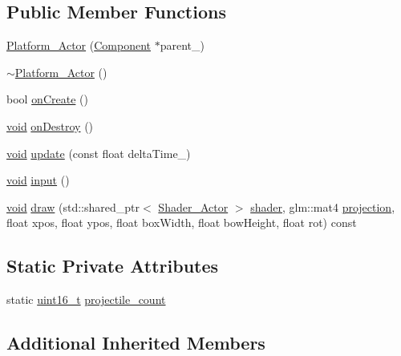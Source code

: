 \subsection*{Public Member Functions}
\begin{DoxyCompactItemize}
\item 
\hyperlink{classPlatform__Actor_ab36d9c9db7a8a50dc7334d44332dc6ce}{Platform\+\_\+\+Actor} (\hyperlink{classComponent}{Component} $\ast$parent\+\_\+)
\item 
\hyperlink{classPlatform__Actor_ab92fd758cdb90a4ddd74f5d4385ed652}{$\sim$\+Platform\+\_\+\+Actor} ()
\item 
bool \hyperlink{classPlatform__Actor_ab902e2540f1d3127dedff632841b4921}{on\+Create} ()
\item 
\hyperlink{imgui__impl__opengl3__loader_8h_ac668e7cffd9e2e9cfee428b9b2f34fa7}{void} \hyperlink{classPlatform__Actor_a34b915aa583cdf659ec29368b6feb7e8}{on\+Destroy} ()
\item 
\hyperlink{imgui__impl__opengl3__loader_8h_ac668e7cffd9e2e9cfee428b9b2f34fa7}{void} \hyperlink{classPlatform__Actor_a12b22d88efc384ac35060d04fbbe710d}{update} (const float delta\+Time\+\_\+)
\item 
\hyperlink{imgui__impl__opengl3__loader_8h_ac668e7cffd9e2e9cfee428b9b2f34fa7}{void} \hyperlink{classPlatform__Actor_a368a0206078f8b44e67386bc6fc47b6c}{input} ()
\item 
\hyperlink{imgui__impl__opengl3__loader_8h_ac668e7cffd9e2e9cfee428b9b2f34fa7}{void} \hyperlink{classPlatform__Actor_aa0d335752ff0db1d54f6e6623215d575}{draw} (std\+::shared\+\_\+ptr$<$ \hyperlink{classShader__Actor}{Shader\+\_\+\+Actor} $>$ \hyperlink{imgui__impl__opengl3__loader_8h_a57b2a96adb1d51204909a82d861e395e}{shader}, glm\+::mat4 \hyperlink{main__menu__state_8cpp_a565d92bfbcc4a481d2d35f3850a382f7}{projection}, float xpos, float ypos, float box\+Width, float bow\+Height, float rot) const
\end{DoxyCompactItemize}
\subsection*{Static Private Attributes}
\begin{DoxyCompactItemize}
\item 
static \hyperlink{stdint_8h_a273cf69d639a59973b6019625df33e30}{uint16\+\_\+t} \hyperlink{classPlatform__Actor_a9c2b5cc9723cdc0b6a64b1b8fbedf548}{projectile\+\_\+count}
\end{DoxyCompactItemize}
\subsection*{Additional Inherited Members}


